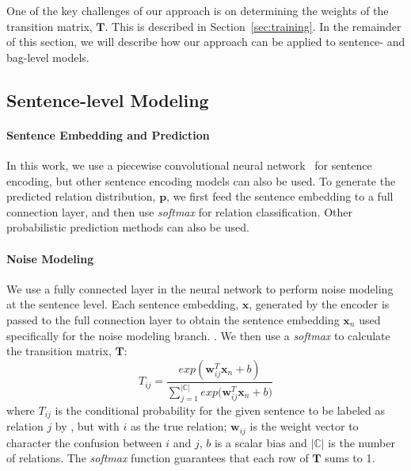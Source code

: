 One of the key challenges of our approach is
on determining the weights of the transition matrix, $\mathbf{T}$. This is described in Section~\ref{sec:training}.
In the remainder of this section, we will describe how our approach can be
applied to sentence- and bag-level models.



\subsection{Sentence-level Modeling}

\paragraph{Sentence Embedding and Prediction}
 In this work, we use a piecewise convolutional neural network~\cite{zeng2015distant} for sentence encoding, but other sentence encoding models can also be used.  
To generate the predicted relation distribution, $\mathbf{p}$,  we first feed the sentence embedding to a full connection layer, and then use \emph{softmax} for
relation classification. Other probabilistic prediction methods can also be used. 

\paragraph{Noise Modeling}

We use a fully connected layer in the neural network to perform noise
modeling at the sentence level. Each sentence embedding, $\mathbf{x}$,
generated by the encoder is passed to the full connection layer  to obtain the
sentence embedding $\mathbf{x}_n$ used specifically for the noise modeling
branch.
.
 We then use a \emph{softmax} to calculate the transition matrix, $\mathbf{T}$:
%
\begin{equation}
T_{ij} = \frac{exp({\mathbf{w}_{ij}^T \mathbf{x}_n + b})}{\sum_{j=1}^{|\mathbb{C}|}{exp({\mathbf{w}_{ij}^T \mathbf{x}_n + b}})}
\end{equation}
where $T_{ij}$ is the conditional probability for the given sentence to be labeled as relation $j$ by \DS, but with $i$ as the true relation; $\mathbf{w}_{ij}$ is the weight vector to character the confusion between $i$ and $j$, $b$ is a scalar bias and $|\mathbb{C}|$ is the number of relations. The \emph{softmax} function guarantees that each row of $\mathbf{T}$ sums to 1.

